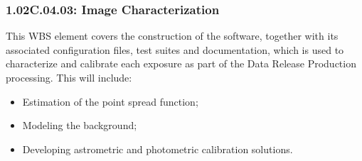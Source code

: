 \subsubsection*{1.02C.04.03: Image Characterization}

This WBS element covers the construction of the software, together with
its associated configuration files, test suites and documentation, which
is used to characterize and calibrate each exposure as part of the Data
Release Production processing. This will include:

\begin{itemize}

\item{Estimation of the point spread function;}
\item{Modeling the background;}
\item{Developing astrometric and photometric calibration solutions.}

\end{itemize}

